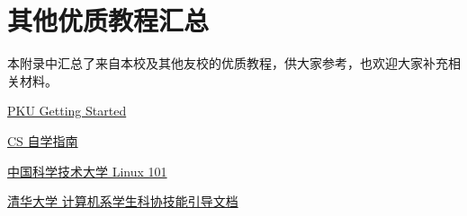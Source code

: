 \documentclass[../main]{subfiles}
\begin{document}
\chapter{其他优质教程汇总}

本附录中汇总了来自本校及其他友校的优质教程，供大家参考，也欢迎大家补充相关材料。

\href{https://missing.lcpu.dev}{PKU Getting Started}

\href{https://csdiy.wiki/}{CS 自学指南}

\href{https://101.lug.ustc.edu.cn/}{中国科学技术大学 Linux 101}

\href{https://docs.net9.org/}{清华大学 计算机系学生科协技能引导文档}
\end{document}
